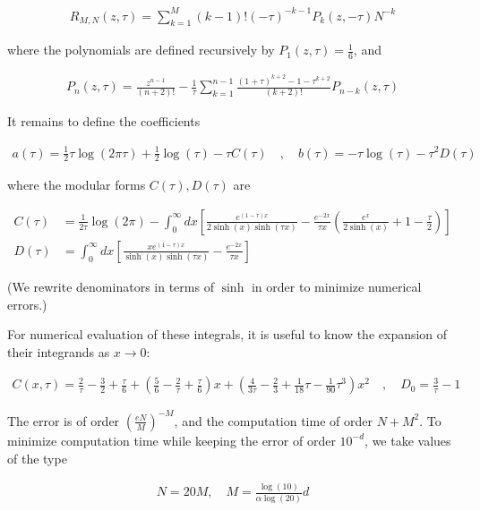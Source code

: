 \documentclass[a4paper]{article}
\numberwithin{equation}{section}
\begin{document}
\begin{align}
R_{M, N}(z,\tau) = \sum_{k=1}^M (k-1)!(-\tau)^{-k-1}P_k(z, -\tau) N^{-k}
\end{align}

where the polynomials are defined recursively by \(P_1(z,\tau)=\frac16\), and

\begin{align}
P_n(z,\tau) = \frac{z^{n-1}}{(n+2)!}-\frac{1}{\tau}\sum_{k=1}^{n-1} \frac{(1+\tau)^{k+2}-1-\tau^{k+2}}{(k+2)!} P_{n-k}(z,\tau)
\end{align}

It remains to define the coefficients

\begin{align}
a(\tau) = \tfrac12\tau\log(2\pi\tau) +\tfrac12\log(\tau) -\tau C(\tau) \quad , \quad b(\tau) =-\tau\log(\tau) -\tau^2D(\tau)
\end{align}

where the modular forms \(C(\tau),D(\tau)\) are

\begin{align}\label{eq:modular_C}
C(\tau) &= \frac{1}{2\tau}\log(2\pi) -\int_0^\infty dx\left[ \frac{e^{(1-\tau)x}}{2\sinh(x)\sinh(\tau x)}- \frac{e^{-2x}}{\tau x}\left(\frac{e^{x}}{2\sinh(x)}+1-\frac{\tau}{2}\right)\right]
\\
\label{eq:modular_D}
D(\tau) &= \int_0^\infty dx\left[ \frac{x e^{(1-\tau)x}}{\sinh(x)\sinh(\tau x)} - \frac{e^{-2x}}{\tau x}\right]
\end{align}

(We rewrite denominators in terms of \(\sinh\) in order to minimize numerical errors.)

For numerical evaluation of these integrals, it is useful to know the expansion of their integrands as \(x\to 0\):

\begin{align}
C(x, \tau) = \frac{2}{\tau} - \frac32 + \frac{\tau}{6} + \left(\frac56 - \frac{2}{\tau} + \frac{\tau}{6}\right)x  + \left( \frac4{3\tau} - \frac23 + \frac1{18}\tau - \frac{1}{90}\tau^{3}\right) x^{2}\quad , \quad D_0 = \frac{3}{\tau}-1
\end{align}

The error is of order \(\left(\frac{eN}{M}\right)^{-M}\), and the computation time of order \(N+ M^2\). To minimize computation time while keeping the error of order \(10^{-d}\), we take values of the type

\begin{align}
N = 20M, \quad M = \frac{\log(10)}{\alpha\log(20)}d
\end{align}
\end{document}
